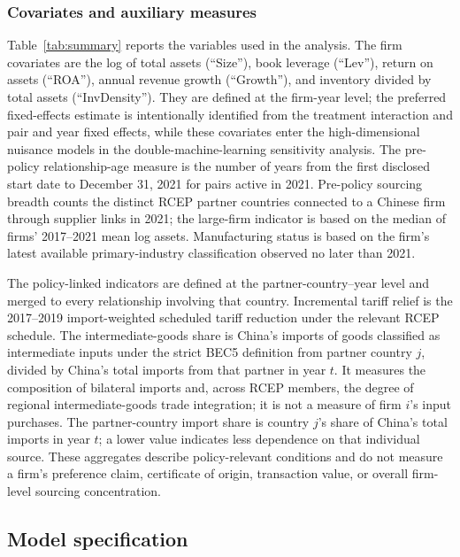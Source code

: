 \documentclass[preprint,12pt,authoryear]{elsarticle}
\begin{document}
\subsubsection{Covariates and auxiliary measures}

Table~\ref{tab:summary} reports the variables used in the analysis. The firm covariates are the log of total assets (``Size''), book leverage (``Lev''), return on assets (``ROA''), annual revenue growth (``Growth''), and inventory divided by total assets (``InvDensity''). They are defined at the firm-year level; the preferred fixed-effects estimate is intentionally identified from the treatment interaction and pair and year fixed effects, while these covariates enter the high-dimensional nuisance models in the double-machine-learning sensitivity analysis. The pre-policy relationship-age measure is the number of years from the first disclosed start date to December 31, 2021 for pairs active in 2021. Pre-policy sourcing breadth counts the distinct RCEP partner countries connected to a Chinese firm through supplier links in 2021; the large-firm indicator is based on the median of firms' 2017--2021 mean log assets. Manufacturing status is based on the firm's latest available primary-industry classification observed no later than 2021.

The policy-linked indicators are defined at the partner-country--year level and merged to every relationship involving that country. Incremental tariff relief is the 2017--2019 import-weighted scheduled tariff reduction under the relevant RCEP schedule. The intermediate-goods share is China's imports of goods classified as intermediate inputs under the strict BEC5 definition from partner country $j$, divided by China's total imports from that partner in year $t$. It measures the composition of bilateral imports and, across RCEP members, the degree of regional intermediate-goods trade integration; it is not a measure of firm $i$'s input purchases. The partner-country import share is country $j$'s share of China's total imports in year $t$; a lower value indicates less dependence on that individual source. These aggregates describe policy-relevant conditions and do not measure a firm's preference claim, certificate of origin, transaction value, or overall firm-level sourcing concentration.

\subsection{Model specification}
\label{sec:strategy}
\end{document}
